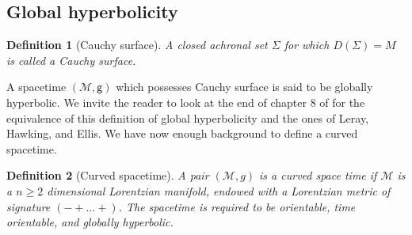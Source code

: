\documentclass[10pt]{book}
\newcommand{\Mcal}{\mathcal{M}}
\newcommand{\Ocal}{\mathcal{O}}
\newcommand{\gsf}{\mathsf{g}}
\theoremstyle{break}
\newtheorem{definition}{Definition}
\begin{document}
\subsection{Global hyperbolicity}






\begin{definition}[Cauchy surface]
A closed achronal set $\Sigma$ for which $D(\Sigma) = M$ is called a Cauchy surface. 
\end{definition}

A spacetime $(\Mcal,\gsf)$ which possesses Cauchy surface is said to be globally hyperbolic. We invite the reader to look at the end of chapter $8$ of %
for the equivalence of this definition of global hyperbolicity and the ones of Leray, Hawking, and Ellis. 
We have now enough background to define a curved spacetime.

\begin{definition}[Curved spacetime]
A pair $(\Mcal,g)$ is a curved space time if $\Mcal$ is a $n \geq 2$ dimensional Lorentzian manifold, endowed with a Lorentzian metric of signature $( - + \dots +)$. The spacetime is required to be orientable, time orientable, and globally hyperbolic. 
\end{definition}




\end{document}
